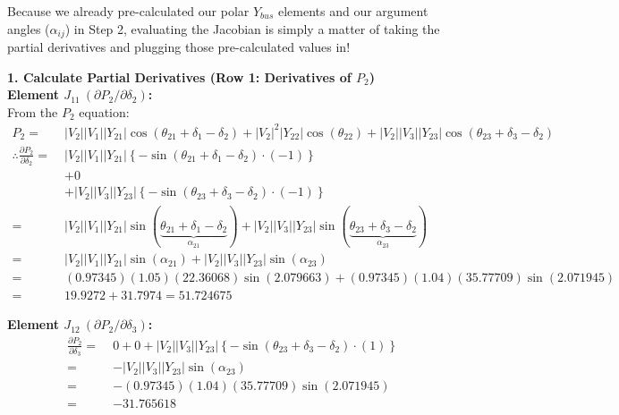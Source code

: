 \documentclass[11pt]{article}
\begin{document}
\begin{stepbox}
Because we already pre-calculated our polar $Y_{bus}$ elements and our argument angles ($\alpha_{ij}$) in Step 2, evaluating the Jacobian is simply a matter of taking the partial derivatives and plugging those pre-calculated values in!

\vspace{0.3cm}
\textbf{1. Calculate Partial Derivatives (Row 1: Derivatives of $P_2$)}\\
%
\noindent \textbf{Element $J_{11} \ (\partial P_2 / \partial \delta_2)$:} \\
From the $P_2$ equation:
\begin{align*}
    P_2 =\;& |V_2||V_1||Y_{21}| \cos(\theta_{21} + \delta_1 - \delta_2) + |V_2|^2|Y_{22}| \cos(\theta_{22}) + |V_2||V_3||Y_{23}| \cos(\theta_{23} + \delta_3 - \delta_2) \\[0.2cm]
    \therefore \frac{\partial P_2}{\partial \delta_2} =\;& |V_2||V_1||Y_{21}| \left\{-\sin(\theta_{21} + \delta_1 - \delta_2) \cdot (-1)\right\} \\
    & + 0 \\
    & + |V_2||V_3||Y_{23}| \left\{-\sin(\theta_{23} + \delta_3 - \delta_2) \cdot (-1)\right\} \\[0.2cm]
    =\;& |V_2||V_1||Y_{21}|\sin(\underbrace{\theta_{21} + \delta_1 - \delta_2}_{\alpha_{21}}) + |V_2||V_3||Y_{23}|\sin(\underbrace{\theta_{23} + \delta_3 - \delta_2}_{\alpha_{23}}) \\[0.2cm]
    =\;& |V_2||V_1||Y_{21}|\sin(\alpha_{21}) + |V_2||V_3||Y_{23}|\sin(\alpha_{23}) \\
    =\;& (0.97345)(1.05)(22.36068)\sin(2.079663) + (0.97345)(1.04)(35.77709)\sin(2.071945) \\
    =\;& 19.9272 + 31.7974 = \mathbf{51.724675}
\end{align*}

\vspace{0.3cm}
\noindent \textbf{Element $J_{12} \ (\partial P_2 / \partial \delta_3)$:} \\
\begin{align*}
    \frac{\partial P_2}{\partial \delta_3} =\;& 0 + 0 + |V_2||V_3||Y_{23}| \left\{-\sin(\theta_{23} + \delta_3 - \delta_2) \cdot (1)\right\} \\[0.2cm]
    =\;& -|V_2||V_3||Y_{23}|\sin(\alpha_{23}) \\
    =\;& -(0.97345)(1.04)(35.77709)\sin(2.071945) \\
    =\;& \mathbf{-31.765618}
\end{align*}


\end{stepbox}
\end{document}
